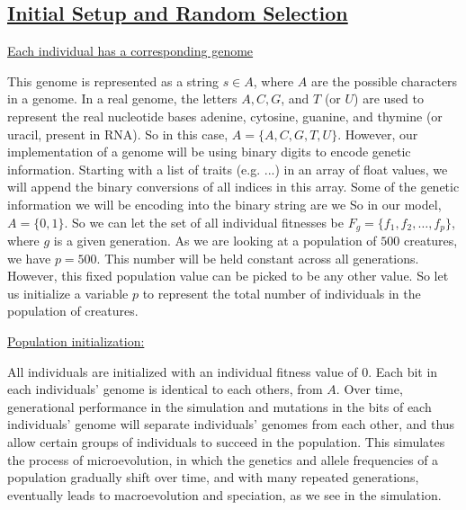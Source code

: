 \newpage
\subsection{\underline{Initial Setup and Random Selection}}

\bigbreak
\nid \underline{Each individual has a corresponding genome}

\bigbreak
This genome is represented as a string $s\in A$, where $A$ are the possible characters in a genome. In a real genome, the letters $A, C, G$, and $T$ (or $U$) are used to represent the real nucleotide bases adenine, cytosine, guanine, and thymine (or uracil, present in RNA). So in this case, $A=\{A, C, G, T, U\}$. However, our implementation of a genome will be using binary digits to encode genetic information. Starting with a list of traits (e.g. ...) in an array of float values, we will append the binary conversions of all indices in this array. Some of the genetic information we will be encoding into the binary string are we  So in our model, $A=\{0,1\}$. So we can let the set of all individual fitnesses be $F_g=\{f_1, f_2, \ldots, f_p\}$, where $g$ is a given generation. As we are looking at a population of $500$ creatures, we have $p=500$. This number will be held constant across all generations. However, this fixed population value can be picked to be any other value. So let us initialize a variable $p$ to represent the total number of individuals in the population of creatures. 

\bigbreak
\nid \underline{Population initialization:}

\bigbreak
All individuals are initialized with an individual fitness value of $0$. Each bit in each individuals' genome is identical to each others, from $A$. Over time, generational performance in the simulation and mutations in the bits of each individuals' genome will separate individuals' genomes from each other, and thus allow certain groups of individuals to succeed in the population. This simulates the process of microevolution, in which the genetics and allele frequencies of a population gradually shift over time, and with many repeated generations, eventually leads to macroevolution and speciation, as we see in the simulation.